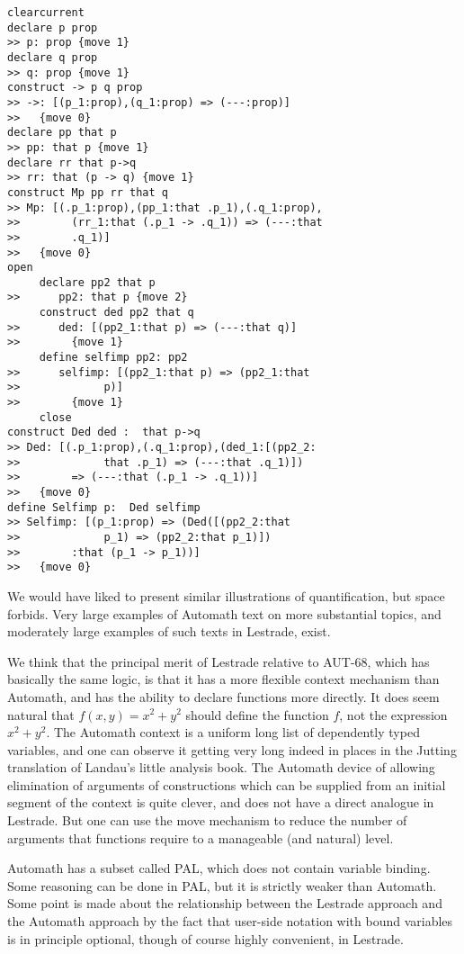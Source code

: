 \documentclass{article}
\begin{document}
\begin{verbatim}
clearcurrent
declare p prop
>> p: prop {move 1}
declare q prop
>> q: prop {move 1}
construct -> p q prop
>> ->: [(p_1:prop),(q_1:prop) => (---:prop)]
>>   {move 0}
declare pp that p
>> pp: that p {move 1}
declare rr that p->q
>> rr: that (p -> q) {move 1}
construct Mp pp rr that q
>> Mp: [(.p_1:prop),(pp_1:that .p_1),(.q_1:prop),
>>        (rr_1:that (.p_1 -> .q_1)) => (---:that 
>>        .q_1)]
>>   {move 0}
open
     declare pp2 that p
>>      pp2: that p {move 2}
     construct ded pp2 that q
>>      ded: [(pp2_1:that p) => (---:that q)]
>>        {move 1}
     define selfimp pp2: pp2
>>      selfimp: [(pp2_1:that p) => (pp2_1:that 
>>             p)]
>>        {move 1}
     close
construct Ded ded :  that p->q
>> Ded: [(.p_1:prop),(.q_1:prop),(ded_1:[(pp2_2:
>>             that .p_1) => (---:that .q_1)])
>>        => (---:that (.p_1 -> .q_1))]
>>   {move 0}
define Selfimp p:  Ded selfimp
>> Selfimp: [(p_1:prop) => (Ded([(pp2_2:that 
>>             p_1) => (pp2_2:that p_1)])
>>        :that (p_1 -> p_1))]
>>   {move 0}
\end{verbatim}

We would have liked to present similar illustrations of quantification, but space forbids.  Very large examples of Automath text on more substantial topics, and moderately large examples of such texts in Lestrade, exist.

We think that the principal merit of Lestrade relative to AUT-68, which has basically the same logic, is that it has a more flexible context mechanism than Automath, and has the ability to declare functions more directly.  It does seem natural that $f(x,y)=x^2+y^2$ should define the function $f$, not the expression $x^2+y^2$.   The Automath context is a uniform long list of dependently typed variables, and one can observe it getting very long indeed in places in the Jutting translation of Landau's little analysis book.  The Automath device of allowing elimination of arguments of constructions which can be supplied from an initial segment of the context is quite clever, and does not have a direct analogue in Lestrade.  But one can use the move mechanism to reduce the number of arguments that functions require to a manageable (and natural) level.

Automath has a subset called PAL, which does not contain variable binding.  Some reasoning can be done in PAL, but it is strictly weaker than Automath.
Some point is made about the relationship between the Lestrade approach and the Automath approach by the fact that user-side notation with bound variables is in principle optional, though of course highly convenient, in Lestrade.
\end{document}
